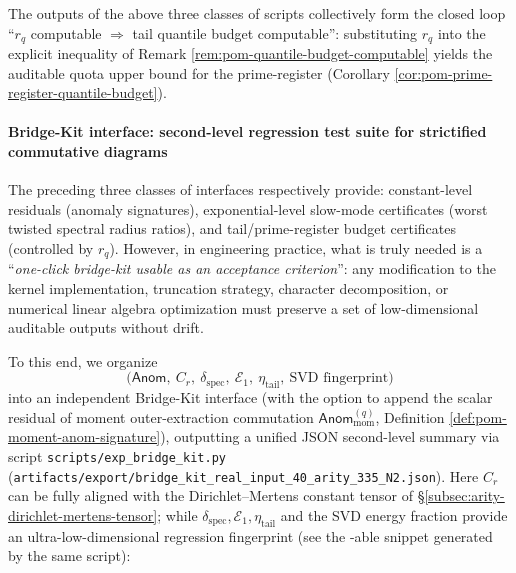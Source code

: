 The outputs of the above three classes of scripts collectively form the closed loop ``\(r_q\) computable \(\Rightarrow\) tail quantile budget computable'': substituting \(r_q\) into the explicit inequality of Remark \ref{rem:pom-quantile-budget-computable} yields the auditable quota upper bound for the prime-register (Corollary \ref{cor:pom-prime-register-quantile-budget}).

\paragraph{Bridge-Kit interface: second-level regression test suite for strictified commutative diagrams}
The preceding three classes of interfaces respectively provide: constant-level residuals (anomaly signatures), exponential-level slow-mode certificates (worst twisted spectral radius ratios), and tail/prime-register budget certificates (controlled by \(r_q\)).
However, in engineering practice, what is truly needed is a ``\emph{one-click bridge-kit usable as an acceptance criterion}'': any modification to the kernel implementation, truncation strategy, character decomposition, or numerical linear algebra optimization must preserve a set of low-dimensional auditable outputs without drift.
\par
To this end, we organize
\[
\bigl(\mathsf{Anom},\ C_r,\ \delta_{\mathrm{spec}},\ \mathcal{E}_1,\ \eta_{\mathrm{tail}},\ \text{SVD fingerprint}\bigr)
\]
into an independent Bridge-Kit interface (with the option to append the scalar residual of moment outer-extraction commutation \(\mathsf{Anom}^{(q)}_{\mathrm{mom}}\), Definition \ref{def:pom-moment-anom-signature}), outputting a unified JSON second-level summary via script
\texttt{scripts/exp\_bridge\_kit.py}
(\texttt{artifacts/export/bridge\_kit\_real\_input\_40\_arity\_335\_N2.json}).
Here \(C_r\) can be fully aligned with the Dirichlet--Mertens constant tensor of \S\ref{subsec:arity-dirichlet-mertens-tensor}; while \(\delta_{\mathrm{spec}},\mathcal{E}_1,\eta_{\mathrm{tail}}\) and the SVD energy fraction provide an ultra-low-dimensional regression fingerprint (see the \verb||-able snippet generated by the same script):


